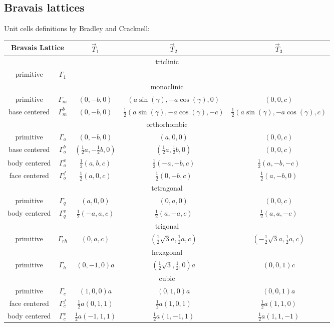 \documentclass[final,12pt,makeidx,DIV=calc]{article}
\begin{document}
{{{{{{\subsection{Bravais lattices}
Unit cells definitions by Bradley and Cracknell\cite{bradley72_book}:
\begin{center}
\begin{tabular}{|c|c|c|c|c|}
\hline
\multicolumn{2}{|c|}{Bravais Lattice} & $\vec{T}_1$& $\vec{T}_2$& $\vec{T}_3$\\
\hline
\hline
\multicolumn{5}{|c|}{triclinic}\\
\hline
primitive & $\Gamma_1$ & & &\\
\hline
%
\hline
\multicolumn{5}{|c|}{monoclinic}\\
\hline
primitive & $\Gamma_m$ & 
$(0,-b,0)$ & 
$(a\sin(\gamma),-a\cos(\gamma),0)$ 
&$(0,0,c)$ \\
base centered & $\Gamma_m^b$ & 
$(0,-b,0)$ & 
$\frac{1}{2}(a\sin(\gamma),-a\cos(\gamma),-c)$ &
$\frac{1}{2}(a\sin(\gamma),-a\cos(\gamma),c)$ \\
\hline
%
\hline
\hline
\multicolumn{5}{|c|}{orthorhombic}\\
\hline
primitive & $\Gamma_o$ & 
$(0,-b,0)$ & 
$(a,0,0)$ 
&$(0,0,c)$ \\
base centered & $\Gamma_o^b$ & 
$(\frac{1}{2}a,-\frac{1}{2}b,0)$ & 
$(\frac{1}{2}a,\frac{1}{2}b,0)$ & 
$(0,0,c)$ \\
body centered & $\Gamma_o^v$ & 
$\frac{1}{2}(a,b,c)$ & 
$\frac{1}{2}(-a,-b,c)$ & 
$\frac{1}{2}(a,-b,-c)$ \\
face centered & $\Gamma_o^f$ & 
$\frac{1}{2}(a,0,c)$ & 
$\frac{1}{2}(0,-b,c)$ & 
$\frac{1}{2}(a,-b,0)$ \\
\hline
%
\hline
\multicolumn{5}{|c|}{tetragonal}\\
\hline
primitive & $\Gamma_q$ & 
$(a,0,0)$ & 
$(0,a,0)$ 
&$(0,0,c)$ \\
\hline
body centered &$\Gamma_q^v$ & 
$\frac{1}{2}(-a,a,c)$ & 
$\frac{1}{2}(a,-a,c)$ & 
$\frac{1}{2}(a,a,-c)$ \\
\hline
%
\hline
\multicolumn{5}{|c|}{trigonal}\\
\hline
primitive & $\Gamma_{rh}$ & 
$(0,a,c)$ & 
$(\frac{1}{2}\sqrt{3}a,\frac{1}{2}a,c)$ &
$(-\frac{1}{2}\sqrt{3}a,\frac{1}{2}a,c)$ \\
\hline
%
\hline
\multicolumn{5}{|c|}{hexagonal}\\
\hline
primitive & $\Gamma_h$ & 
$(0,-1,0)a$ & 
$(\frac{1}{2}\sqrt{3},\frac{1}{2},0)a$ &
$(0,0,1)c$\\
\hline
%
\hline
\multicolumn{5}{|c|}{cubic}\\
\hline
primitive & $\Gamma_c$ & 
$(1,0,0)a$ & 
$(0,1,0)a$ & 
$(0,0,1)a$ \\
face centered & $\Gamma_c^f$ & 
$\frac{1}{2}a(0,1,1)$ & 
$\frac{1}{2}a(1,0,1)$ & 
$\frac{1}{2}a(1,1,0)$ \\
body centered & $\Gamma_c^v$ & 
$\frac{1}{2}a(-1,1,1)$ & 
$\frac{1}{2}a(1,-1,1)$ & 
$\frac{1}{2}a(1,1,-1)$ \\
\hline
\end{tabular}
\end{center}

}}}}}}
\end{document}
